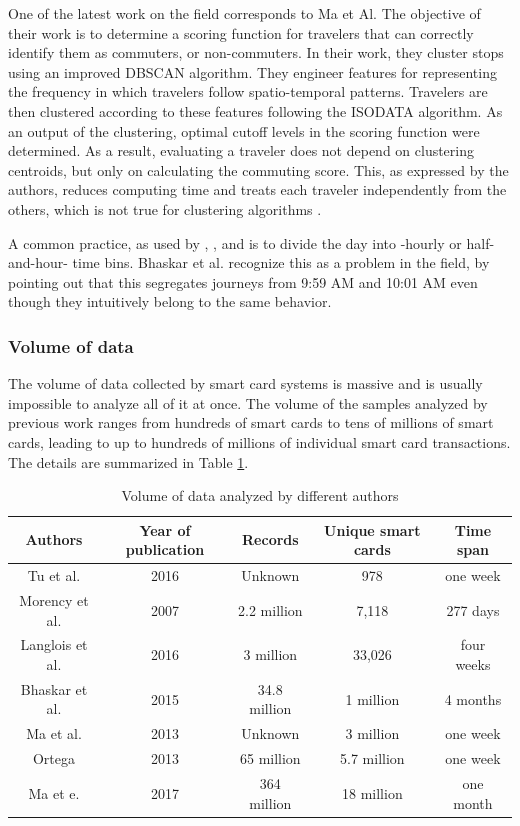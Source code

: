\documentclass{article}
\begin{document}
One of the latest work on the field corresponds to Ma et Al. The objective of their work is to determine a scoring function for travelers that can correctly identify them as commuters, or non-commuters. In their work, they cluster stops using an improved DBSCAN algorithm. They engineer features for representing the frequency in which travelers follow spatio-temporal patterns. Travelers are then clustered according to these features following the ISODATA algorithm. As an output of the clustering, optimal cutoff levels in the scoring function were determined. As a result, evaluating a traveler does not depend on clustering centroids, but only on calculating the commuting score. This, as expressed by the authors, reduces computing time and treats each traveler independently from the others, which is not true for clustering algorithms \cite{ma2017understanding}.

A common practice, as used by \cite{ma2017understanding}, \cite{langlois2016inferring}, and \cite{morency2007measuring} is to divide the day into -hourly or half-and-hour- time bins. Bhaskar et al. recognize this as a problem in the field, by pointing out that this segregates journeys from 9:59 AM and 10:01 AM even though they intuitively belong to the same behavior. 

\subsubsection{Volume of data}
The volume of data collected by smart card systems is massive and is usually impossible to analyze all of it at once. The volume of the samples analyzed by previous work ranges from hundreds of smart cards to tens of millions of smart cards, leading to up to hundreds of millions of individual smart card transactions. The details are summarized in Table \ref{table:volumeData}.
 
\begin{table}[H]
\centering
\begin{tabular}{||c c c c c||} 
 \hline
 Authors & Year of publication & Records & Unique smart cards & Time span \\ [0.5ex] 
 \hline\hline
 Tu et al. \cite{tu2016impact} & 2016 & Unknown & 978 & one week \\ 
 Morency et al. \cite{morency2007measuring} & 2007 & 2.2 million & 7,118 & 277 days \\
 Langlois et al. \cite{langlois2016inferring} & 2016 & 3 million & 33,026 & four weeks \\
 Bhaskar et al. \cite{bhaskar2015passenger} & 2015 & 34.8 million & 1 million & 4 months \\ %
 Ma et al. \cite{ma2013mining} & 2013 & Unknown & 3 million & one week \\
 Ortega \cite{ortega2013classification} & 2013 & 65 million & 5.7 million & one week \\
 Ma et e. \cite{ma2017understanding} & 2017 & 364 million & 18 million & one month\\ [1ex] 
 \hline
\end{tabular}
\caption{Volume of data analyzed by different authors}
\label{table:volumeData}
\end{table}
\end{document}
